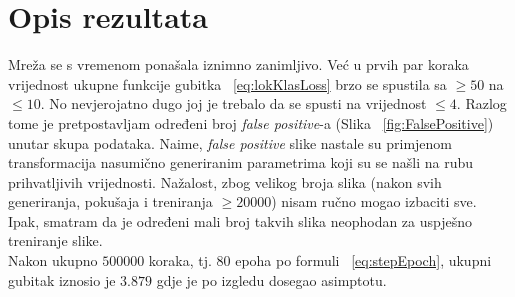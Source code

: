 \section{Opis rezultata}
Mreža se s vremenom ponašala iznimno zanimljivo.
Već u prvih par koraka vrijednost ukupne funkcije gubitka ~\ref{eq:lokKlasLoss} brzo se spustila sa $\geq 50$ na $\leq 10$.
No nevjerojatno dugo joj je trebalo da se spusti na vrijednost $\leq 4$.
Razlog tome je pretpostavljam određeni broj \emph{false positive}-a (Slika ~\ref{fig:FalsePositive}) unutar skupa podataka.
Naime, \emph{false positive} slike nastale su primjenom transformacija nasumično generiranim parametrima koji su se našli na rubu prihvatljivih vrijednosti.
Nažalost, zbog velikog broja slika (nakon svih generiranja, pokušaja i treniranja $\geq 20000$) nisam ručno mogao izbaciti sve.
Ipak, smatram da je određeni mali broj takvih slika neophodan za uspješno treniranje slike. \\
Nakon ukupno $500 000$ koraka, tj. $80$ epoha po formuli ~\ref{eq:stepEpoch},  ukupni gubitak iznosio je $3.879$ gdje je po izgledu dosegao asimptotu.
